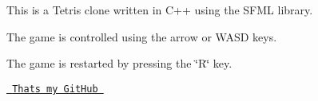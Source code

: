 This is a Tetris clone written in C++ using the SFML library. 

The game is controlled using the arrow or WASD keys. 

The game is restarted by pressing the \char`\"{}\+R\char`\"{} key. 

\href{https://github.com/Szymon-Stasiak}{\texttt{ That\textquotesingle{}s my Git\+Hub }} 
